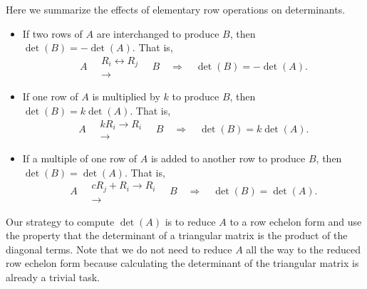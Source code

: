 \documentclass{ximera}
\begin{document}
\begin{concept}
  Here we summarize the effects of elementary row operations on
  determinants.
  \begin{itemize}
  \item If two rows of $A$ are interchanged to produce $B$, then
    $\det(B) = -\det(A)$. That is,
    \[
      A
      \quad
      \begin{matrix}
        \scriptstyle R_i \leftrightarrow R_j \\ \longrightarrow
      \end{matrix}
      \quad
      B
      \quad\Longrightarrow\quad
      \det(B) = -\det(A).
    \]
  \item If one row of $A$ is multiplied by $k$ to produce $B$, then
    $\det(B) = k \det(A)$. That is,
    \[
      A
      \quad
      \begin{matrix}
        \scriptstyle {k R_i \to R_i} \\ \longrightarrow
      \end{matrix}
      \quad
      B
      \quad\Longrightarrow\quad
      \det(B) = k\det(A).
    \]
  \item If a multiple of one row of $A$ is added to another row to
    produce $B$, then $\det(B) = \det(A)$. That is,
    \[
      A
      \quad
      \begin{matrix}
        \scriptstyle{c R_j + R_i \to R_i} \\ \longrightarrow
      \end{matrix}
      \quad
      B
      \quad\Longrightarrow\quad
      \det(B) = \det(A).
    \]
  \end{itemize}
\end{concept}

Our strategy to compute $\det(A)$ is to reduce $A$ to a row echelon
form and use the property that the determinant of a triangular matrix
is the product of the diagonal terms. Note that we do not need to
reduce $A$ all the way to the reduced row echelon form because
calculating the determinant of the triangular matrix is already
a trivial task.
\end{document}
